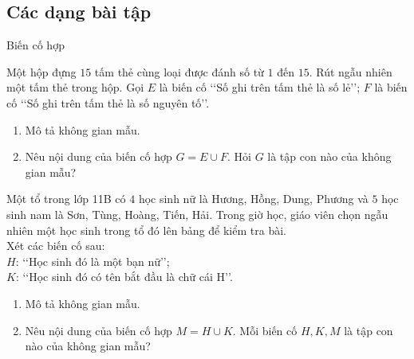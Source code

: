 \subsection{Các dạng bài tập}
\begin{dang}{Biến cố hợp}
\end{dang}
\begin{vd}%
	Một hộp đựng $15$ tấm thẻ cùng loại được đánh số từ $1$ đến $15$. Rút ngẫu nhiên một tấm thẻ trong hộp. Gọi $E$ là biến cố \lq\lq  Số ghi trên tấm thẻ là số lẻ\rq\rq; $F$ là biến cố \lq\lq  Số ghi trên tấm thẻ là số nguyên tố\rq\rq.
	\begin{enumerate}
		\item Mô tả không gian mẫu.
		\item Nêu nội dung của biến cố hợp $G=E \cup F$. Hỏi $G$ là tập con nào của không gian mẫu?
	\end{enumerate}
\end{vd}
\begin{vd}%
	Một tổ trong lớp 11B có $4$ học sinh nữ là Hương, Hồng, Dung, Phương và $5$ học sinh nam là Sơn, Tùng, Hoàng, Tiến, Hải. Trong giờ học, giáo viên chọn ngẫu nhiên một học sinh trong tổ đó lên bảng để kiểm tra bài.\\
	Xét các biến cố sau:\\
	$H$: \lq\lq  Học sinh đó là một bạn nữ\rq\rq;\\
	$K$: \lq\lq  Học sinh đó có tên bắt đầu là chữ cái $\mathrm{H}$\rq\rq.
	\begin{enumerate}
		\item Mô tả không gian mẫu.
		\item Nêu nội dung của biến cố hợp $M=H \cup K$. Mỗi biến cố $H, K, M$ là tập con nào của không gian mẫu?
	\end{enumerate}
\end{vd}
